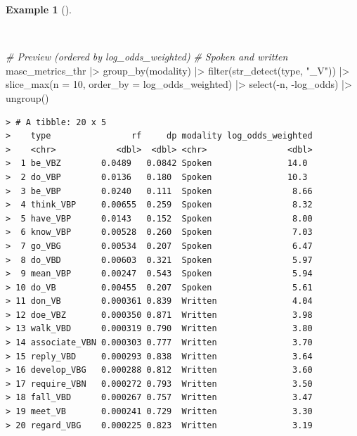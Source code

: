\documentclass[
  letterpaper,
  DIV=11,
  numbers=noendperiod]{scrreport}
\newenvironment{Shaded}{\begin{snugshade}}{\end{snugshade}}
\newcommand{\AttributeTok}[1]{\textcolor[rgb]{0.00,0.00,0.00}{#1}}
\newcommand{\CommentTok}[1]{\textcolor[rgb]{0.00,0.00,0.00}{\textit{#1}}}
\newcommand{\DecValTok}[1]{\textcolor[rgb]{0.00,0.00,0.00}{#1}}
\newcommand{\FunctionTok}[1]{\textcolor[rgb]{0.00,0.00,0.00}{#1}}
\newcommand{\NormalTok}[1]{\textcolor[rgb]{0.00,0.00,0.00}{#1}}
\newcommand{\SpecialCharTok}[1]{\textcolor[rgb]{0.00,0.00,0.00}{#1}}
\newcommand{\StringTok}[1]{\textcolor[rgb]{0.00,0.00,0.00}{#1}}
\theoremstyle{definition}
\newtheorem{example}{Example}[chapter]
\theoremstyle{remark}
\begin{document}
\begin{example}[]\protect\hypertarget{exm-eda-masc-log-odds-weighted-verbs}{}\label{exm-eda-masc-log-odds-weighted-verbs}

~

\begin{Shaded}
\begin{Highlighting}[]
\CommentTok{\# Preview (ordered by log\_odds\_weighted)}
\CommentTok{\# Spoken and written}
\NormalTok{masc\_metrics\_thr }\SpecialCharTok{|\textgreater{}} 
  \FunctionTok{group\_by}\NormalTok{(modality) }\SpecialCharTok{|\textgreater{}} 
  \FunctionTok{filter}\NormalTok{(}\FunctionTok{str\_detect}\NormalTok{(type, }\StringTok{"\_V"}\NormalTok{)) }\SpecialCharTok{|\textgreater{}} 
  \FunctionTok{slice\_max}\NormalTok{(}\AttributeTok{n =} \DecValTok{10}\NormalTok{, }\AttributeTok{order\_by =}\NormalTok{ log\_odds\_weighted) }\SpecialCharTok{|\textgreater{}}
  \FunctionTok{select}\NormalTok{(}\SpecialCharTok{{-}}\NormalTok{n, }\SpecialCharTok{{-}}\NormalTok{log\_odds) }\SpecialCharTok{|\textgreater{}}
  \FunctionTok{ungroup}\NormalTok{() }
\end{Highlighting}
\end{Shaded}

\begin{verbatim}
> # A tibble: 20 x 5
>    type                rf     dp modality log_odds_weighted
>    <chr>            <dbl>  <dbl> <chr>                <dbl>
>  1 be_VBZ        0.0489   0.0842 Spoken               14.0 
>  2 do_VBP        0.0136   0.180  Spoken               10.3 
>  3 be_VBP        0.0240   0.111  Spoken                8.66
>  4 think_VBP     0.00655  0.259  Spoken                8.32
>  5 have_VBP      0.0143   0.152  Spoken                8.00
>  6 know_VBP      0.00528  0.260  Spoken                7.03
>  7 go_VBG        0.00534  0.207  Spoken                6.47
>  8 do_VBD        0.00603  0.321  Spoken                5.97
>  9 mean_VBP      0.00247  0.543  Spoken                5.94
> 10 do_VB         0.00455  0.207  Spoken                5.61
> 11 don_VB        0.000361 0.839  Written               4.04
> 12 doe_VBZ       0.000350 0.871  Written               3.98
> 13 walk_VBD      0.000319 0.790  Written               3.80
> 14 associate_VBN 0.000303 0.777  Written               3.70
> 15 reply_VBD     0.000293 0.838  Written               3.64
> 16 develop_VBG   0.000288 0.812  Written               3.60
> 17 require_VBN   0.000272 0.793  Written               3.50
> 18 fall_VBD      0.000267 0.757  Written               3.47
> 19 meet_VB       0.000241 0.729  Written               3.30
> 20 regard_VBG    0.000225 0.823  Written               3.19
\end{verbatim}

\end{example}
\end{document}
